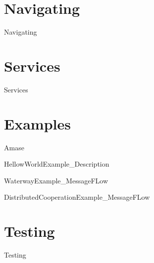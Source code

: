\documentclass{tufte-book} %
\begin{document}
\chapter{Navigating}
\renewcommand{\FiguresPath}{./Navigating/figures}
{Navigating}


\chapter{Services}
\renewcommand{\FiguresPath}{./Services/figures}
\newcommand{\CCAFiguresPath}{./../SequenceDiagrams}
{Services}


\chapter{Examples}


\renewcommand{\FiguresPath}{./Examples/doc_Amase/figures}
{Amase}


\renewcommand{\FiguresPath}{./Examples/doc_HelloWorld/figures}
{HellowWorldExample_Description}

\cleardoublepage

\renewcommand{\FiguresPath}{./Examples/doc_WaterwaySearch/figures}
{WaterwayExample_MessageFLow}

\cleardoublepage

\renewcommand{\FiguresPath}{./Examples/doc_DistributedCooperation/figures}
{DistributedCooperationExample_MessageFLow}


\chapter{Testing}
\renewcommand{\FiguresPath}{./Testing/figures}
{Testing}
\end{document}
